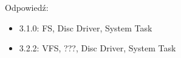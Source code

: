 Odpowiedź:
\begin{itemize}
	\item 3.1.0: FS, Disc Driver, System Task
	\item 3.2.2: VFS, ???, Disc Driver, System Task
\end{itemize}
